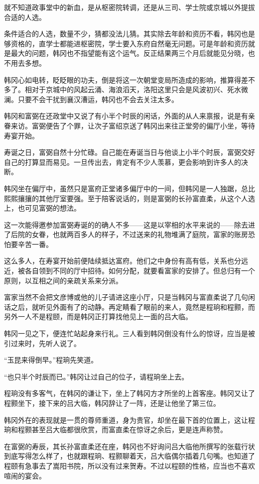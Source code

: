 就不知道政事堂中的新血，是从枢密院转调，还是从三司、学士院或京城以外提拔合适的人选。

条件适合的人选，数量不少，猜都没法儿猜。其实除去年龄和资历不看，韩冈也是够资格的，直学士都能进枢密院，学士要入东府自然毫无问题。可是年龄和资历就是最大的问题，韩冈也不指望能有这个运气。反正结果两三个月后就能见分晓，也不用去多想。

韩冈心如电转，眨眨眼的功夫，倒是将这一次朝堂变局所造成的影响，推算得差不多了。相对于京城中的风起云涌、海浪滔天，洛阳这里只会是风波初兴、死水微澜。只要不会干扰到襄汉漕运，韩冈也不会去关注太多。

韩冈和富弼在还政堂中又说了有小半个时辰的闲话，外面的从人来禀报，说是有亲眷来访。富弼便告了个罪，让次子富绍京送了韩冈出来往正堂旁的偏厅小坐，等待寿宴开始。

寿诞之日，富弼自然十分忙碌。自己能在寿诞当日与他谈上小半个时辰，富弼交好自己的打算显而易见。一旦传出去，肯定有不少人羡慕，更会影响到许多人的决断。

韩冈坐在偏厅中，虽然只是富府正堂诸多偏厅中的一间，但韩冈是一人独踞，总比熙熙攘攘的其他厅室要强。至于陪客说话的，则是富弼的长孙富直柔，从这个人选上，也可见富弼的想法。

这一次能得邀参加富弼寿诞的的确人不多——这是以宰相的水平来说的——除去进了后院的女眷，也就两百多人的样子，不过送来的礼物堆满了庭院，富家的账房恐怕要辛苦一番。

这么多人，在寿宴开始前便陆续抵达富府。他们之中身份有高有低，关系也分远近，被各自领到不同的厅中招待。如何分配，就要看富家的安排了。但总归有一个原则，以互相之间的亲疏关系来分派。

富家当然不会把文彦博或他的儿子请进这座小厅，只是当韩冈与富直柔说了几句闲话之后，就听见外面有了的动静。再定睛看了眼前的来人，竟然是程珦和程颢，而另外一人不是程颐，而是韩冈正打算找他见上一面的吕大临。

韩冈一见之下，便连忙站起身来行礼。三人看到韩冈倒没有什么的惊讶，应当是被引过来时，先听人说了。

“玉昆来得倒早。”程珦先笑道。

“也只半个时辰而已。”韩冈让过自己的位子，请程珦坐上去。

程珦没有多客气，在韩冈的谦让下，坐上了韩冈方才所坐的上首客座。韩冈又让了程颢坐下，接下来的吕大临，韩冈辞让了一阵，还是让他坐了第三位。

韩冈外在的表现就是一贯的尊师重道，身为贵官，却坐在最下首的位置上，这让程珦和程颢甚至吕大临都很欣赏，而富直柔在惊讶之余后，更是连声称赞。

在富弼的寿辰，其长孙富直柔还在座，韩冈也不好询问吕大临他所撰写的张载行状到底写得怎么样了，也就跟程珦、程颢聊着天，吕大临偶尔插着几句嘴。也知道了程颐有急事去了嵩阳书院，所以没有过来贺寿。不过以程颐的性格，应当也不喜欢喧闹的宴会。

